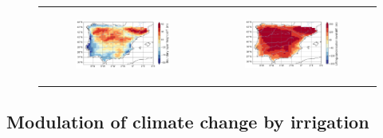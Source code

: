 \begin{figure}[htbp]
\begin{tabular}{cc}
        \begin{subfigure}[b]{0.5\textwidth}
            \caption{}
            \includegraphics[width=\textwidth]{images/chap4/future/diffmap_s_pblh_presfut.png}
        \end{subfigure} &
        \begin{subfigure}[b]{0.5\textwidth}
            \caption{}
            \includegraphics[width=\textwidth]{images/chap4/future/diffmap_s_lcl_presfut.png}
        \end{subfigure} \\
    \end{tabular}
    \caption{}
    \label{fig:diffmaps_present_future}
\end{figure}

\clearpage

\subsection{Modulation of climate change by irrigation}

